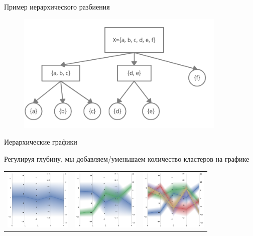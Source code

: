 \documentclass[fleqn, xcolor=x11names]{beamer}
\begin{document}
\begin{frame}{Пример иерархического разбиения}


    \begin{figure}[htb]
        \centering
        \includegraphics[width=10cm]{hierarchical_graph.png}
    \end{figure}
\end{frame}


\begin{frame}{Иерархические графики}

    \vspace{-20pt}

    Регулируя глубину, мы добавляем/уменьшаем количество кластеров на графике

    \vspace{20pt}

    \begin{tabular}{ccc}
        \centering
        \includegraphics[width=3.2cm]{h_clustering_1.pdf} &
        \includegraphics[width=3.2cm]{h_clustering_2.pdf} &
        \includegraphics[width=3.2cm]{h_clustering_5.pdf}

    \end{tabular}

\end{frame}
\end{document}
